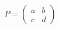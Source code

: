 \documentclass[preview]{standalone}
\begin{document}
\begin{align*}
P = \begin{pmatrix} a & b \\ c & d \end{pmatrix}
\end{align*}
\end{document}
